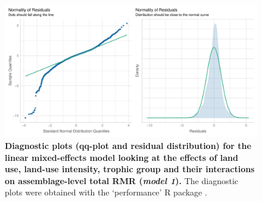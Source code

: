 \begin{figure}[h!]
\centering
\includegraphics[scale=0.75]{Supporting/Chapter5/Figures/DiagnosticplotstRMR}
\caption[Diagnostic plots for the linear mixed-effects model looking at the effects of land use, land-use intensity, trophic group and their interactions on assemblage-level total RMR]{\textbf{Diagnostic plots (qq-plot and residual distribution) for the linear mixed-effects model looking at the effects of land use, land-use intensity, trophic group and their interactions on assemblage-level total RMR (\textit{model 1}).} The diagnostic plots were obtained with the `performance' R package \citep{performance}.}
\label{SI5_figure3}
\end{figure}

